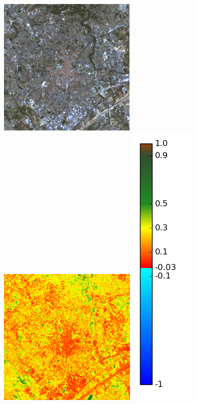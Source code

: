 \documentclass{book}
\begin{document}
\begin{figure}[H]
{}
\centerline{
\includegraphics[scale=0.6]{../3_ndvi/images/Montpellier/07_rgb.png}
\includegraphics[scale=0.6]{../3_ndvi/images/Montpellier/07_ndvi.png}
\includegraphics[scale=0.3]{../3_ndvi/images/colormap.png}
}
\end{figure}
\end{document}
